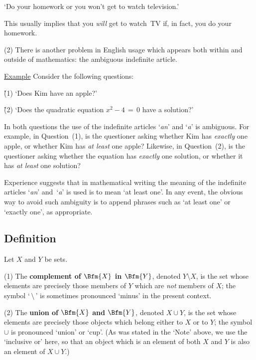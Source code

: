         `Do your homework or you won't get to watch television.'

\noindent This usually implies that you {\em will} get to watch~TV if, in fact, you do your homework.

\V

        (2) There is another problem in English usage which appears both within and outside of mathematics: the ambiguous indefinite article.

        \h \underline{Example} Consider the following questions:

        \h \h (1) `Does Kim have an apple?'

        \h \h (2) `Does the quadratic equation $x^{2} - 4 \,=\, 0$ have a solution?'

\noindent In both questions the use of the indefinite articles `{\em an}' and `{\em a}' is ambiguous. For example, in Question~(1),
    is the questioner asking whether Kim has {\em exactly} one apple, or whether Kim has {\em at least} one apple?
    Likewise, in Question~(2), is the questioner asking whether the equation has {\em exactly} one solution, or whether it has {\em at least} one solution?


        Experience suggests that in mathematical writing the meaning of the indefinite articles `{\em an}' and~`{\em a}' is used is to mean `at least one'.
    In any event, the obvious way to avoid such ambiguity is to append phrases such as `at least one' or `exactly one', as appropriate.
        
\V
\V


            \subsection{\small{\bf Definition}}
            \label{DefA10.15}

\hspace*{\parindent} Let $X$ and $Y$ be sets.

\V

        (1) The {\bf complement of $\Bfm{X}$ in $\Bfm{Y}$},
    denoted $Y{\setminus}X$, is the set whose elements are precisely those members of $Y$ which are {\em not} members of $X$;
    the symbol `$\,{\setminus}\,$' is sometimes pronounced `minus' in the present context.

\V

        (2) The {\bf union of $\Bfm{X}$ and $\Bfm{Y}$}, denoted $X{\cup}Y$, is the set whose elements are precisely those objects which belong either to $X$ or to $Y$;
    the symbol ${\cup}$ is pronounced `union' or `cup'.
    (As was stated in the  `Note' above, we use the `inclusive or' here, so that an object which is an element of both $X$ and $Y$ is also an element of $X{\cup}Y$.)

